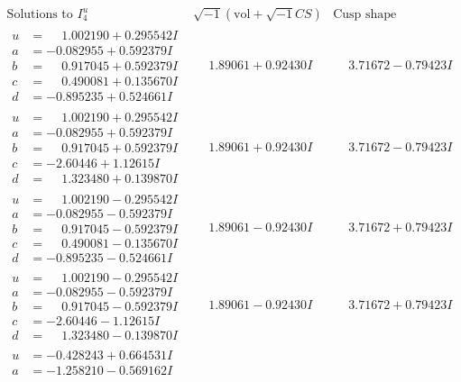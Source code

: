 \documentclass[1p]{elsarticle_modified}
\theoremstyle{definition}
\newcommand{\I}{\sqrt{-1}}
\begin{document}
$$\begin{array}{c|c|c}  
\text{Solutions to }I^u_{4}& \I (\text{vol} + \sqrt{-1}CS) & \text{Cusp shape}\\
 \hline 
\begin{aligned}
u &= \phantom{-}1.002190 + 0.295542 I \\
a &= -0.082955 + 0.592379 I \\
b &= \phantom{-}0.917045 + 0.592379 I \\
c &= \phantom{-}0.490081 + 0.135670 I \\
d &= -0.895235 + 0.524661 I\end{aligned}
 & \phantom{-}1.89061 + 0.92430 I & \phantom{-}3.71672 - 0.79423 I \\ \hline\begin{aligned}
u &= \phantom{-}1.002190 + 0.295542 I \\
a &= -0.082955 + 0.592379 I \\
b &= \phantom{-}0.917045 + 0.592379 I \\
c &= -2.60446 + 1.12615 I \\
d &= \phantom{-}1.323480 + 0.139870 I\end{aligned}
 & \phantom{-}1.89061 + 0.92430 I & \phantom{-}3.71672 - 0.79423 I \\ \hline\begin{aligned}
u &= \phantom{-}1.002190 - 0.295542 I \\
a &= -0.082955 - 0.592379 I \\
b &= \phantom{-}0.917045 - 0.592379 I \\
c &= \phantom{-}0.490081 - 0.135670 I \\
d &= -0.895235 - 0.524661 I\end{aligned}
 & \phantom{-}1.89061 - 0.92430 I & \phantom{-}3.71672 + 0.79423 I \\ \hline\begin{aligned}
u &= \phantom{-}1.002190 - 0.295542 I \\
a &= -0.082955 - 0.592379 I \\
b &= \phantom{-}0.917045 - 0.592379 I \\
c &= -2.60446 - 1.12615 I \\
d &= \phantom{-}1.323480 - 0.139870 I\end{aligned}
 & \phantom{-}1.89061 - 0.92430 I & \phantom{-}3.71672 + 0.79423 I \\ \hline\begin{aligned}
u &= -0.428243 + 0.664531 I \\
a &= -1.258210 - 0.569162 I \\

\end{aligned}
\end{array}$$
\end{document}
